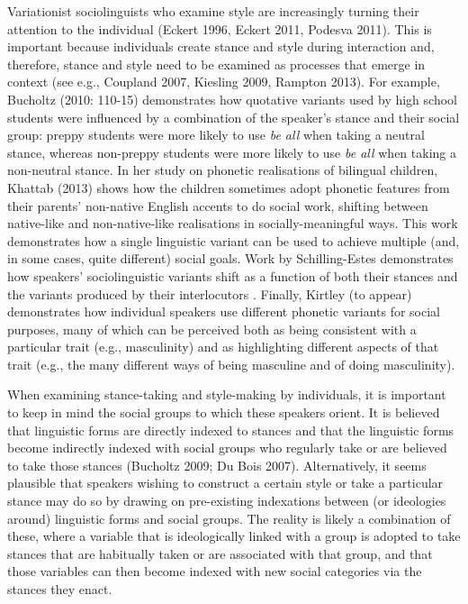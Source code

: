 \noindent Variationist sociolinguists who examine style are increasingly turning their attention to the individual (Eckert 1996, Eckert 2011, Podesva 2011).  This is important because individuals create stance and style during interaction and, therefore, stance and style need to be examined as processes that emerge in context (see e.g., Coupland 2007, Kiesling 2009, Rampton 2013). For example, Bucholtz (2010: 110-15) demonstrates how quotative variants used by high school students were influenced by a combination of the speaker's stance and their social group: preppy students were more likely to use \textit{be all} when taking a neutral stance, whereas non-preppy students were more likely to use \textit{be all} when taking a non-neutral stance.  In her study on phonetic realisations of bilingual children, Khattab (2013) shows how the children sometimes adopt phonetic features from their parents' non-native English accents to do social work, shifting between native-like and non-native-like realisations in socially-meaningful ways.  This work demonstrates how a single linguistic variant can be used to achieve multiple (and, in some cases, quite different) social goals. Work by Schilling-Estes demonstrates how speakers' sociolinguistic variants shift as a function of both their stances and the variants produced by their interlocutors \cite{schillingestes2004}. Finally, Kirtley (to appear) demonstrates how individual speakers use different phonetic variants for social purposes, many of which can be perceived both as being consistent with a particular trait (e.g., masculinity) and as highlighting different aspects of that trait (e.g., the many different ways of being masculine and of doing masculinity).  \nocite{coupland2007} \nocite{kiesling2009} \nocite{rampton2013} \nocite{bucholtz2010} \nocite{khattab2013} \nocite{kirtley-diss} \nocite{podesva2011} \nocite{eckert2011} \nocite{eckert1996nailpolish}

When examining stance-taking and style-making by individuals, it is important to keep in mind the social groups to which these speakers orient.  It is believed that linguistic forms are directly indexed to stances and that the linguistic forms become indirectly indexed with social groups who regularly take or are believed to take those stances (Bucholtz 2009; Du Bois 2007). Alternatively, it seems plausible that speakers wishing to construct a certain style or take a particular stance may do so by drawing on pre-existing indexations between (or ideologies around) linguistic forms and social groups.  The reality is likely a combination of these, where a variable that is ideologically linked with a group is adopted to take stances that are habitually taken or are associated with that group, and that those variables can then become indexed with new social categories via the stances they enact. \nocite{bucholtz2009} \nocite{dubois2007}


